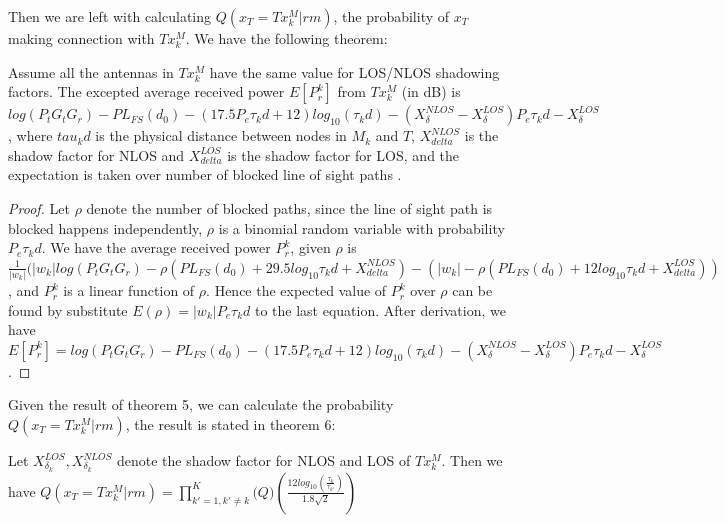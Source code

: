 \documentclass[conference]{IEEEtran}
\begin{document}
Then we are left with calculating $Q(x_{T}=Tx_{k}^{M}|rm)$, the probability of $x_{T}$ making connection with $Tx_{k}^{M}$. We have the following theorem:
\begin{mydef1}
	Assume all the antennas in $Tx_{k}^{M}$ have the same value for LOS/NLOS shadowing factors. The excepted average received power $E[P_{r}^{k}]$ from $Tx_{k}^{M}$ (in dB) is $log(P_{t}G_{t}G_{r})-PL_{FS}(d_{0})-(17.5P_{e}\tau_{k}d+12)log_{10}(\tau_{k}d)-(X^{NLOS}_{\delta}-X^{LOS}_{\delta})P_{e}\tau_{k}d-X^{LOS}_{\delta}$, where $tau_{k}d$ is the physical distance between nodes in $M_{k}$ and $T$, $X^{NLOS}_{delta}$ is the shadow factor for NLOS and $X^{LOS}_{delta}$ is the shadow factor for LOS, and the expectation is taken over number of blocked line of sight paths .
\end{mydef1}
\begin{proof}
	Let $\rho$ denote the number of blocked paths, since the line of sight path is blocked happens independently, $\rho$ is a binomial random variable with probability $P_{e}\tau_{k}d$. We have the average received power $P_{r}^{k}$, given $\rho$ is $\frac{1}{|w_{k}|}(|w_{k}|log(P_{t}G_{t}G_{r})-\rho(PL_{FS}(d_{0})+29.5log_{10}\tau_{k}d + X^{NLOS}_{delta})-(|w_{k}|-\rho(PL_{FS}(d_{0})+12log_{10}\tau_{k}d + X^{LOS}_{delta}))$, and $P_{r}^{k}$ is a linear function of $\rho$. Hence the expected value of $P_{r}^{k}$ over $\rho$ can be found by substitute $E(\rho) = |w_{k}|P_{e}\tau_{k}d$ to the last equation. After derivation, we have $E[P_{r}^{k}]=log(P_{t}G_{t}G_{r})-PL_{FS}(d_{0})-(17.5P_{e}\tau_{k}d+12)log_{10}(\tau_{k}d)-(X^{NLOS}_{\delta}-X^{LOS}_{\delta})P_{e}\tau_{k}d-X^{LOS}_{\delta}$.
\end{proof}
Given the result of theorem 5, we can calculate the probability $Q(x_{T}=Tx_{k}^{M}|rm)$, the result is stated in theorem 6:
\begin{mydef1}
	Let $X^{LOS}_{\delta_{k}},X^{NLOS}_{\delta_{k}}$ denote the shadow factor for NLOS and LOS of $Tx_{k}^{M}$. Then we have $Q(x_{T}=Tx_{k}^{M}|rm) = \prod_{k'=1,k'\neq k}^{K} \mathcal(Q)(\frac{12log_{10}(\frac{\tau_{k}}{\tau_{k'}})}{1.8\sqrt{2}})$
\end{mydef1}
\end{document}
